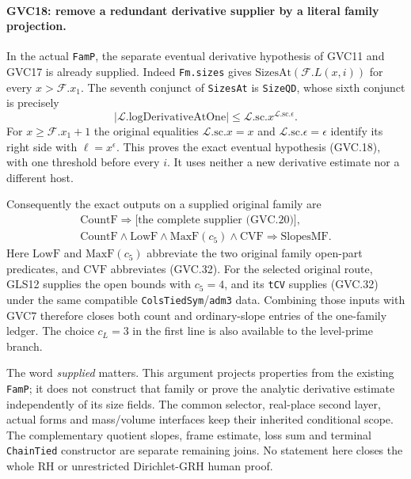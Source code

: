 \paragraph{GVC18: remove a redundant derivative supplier by a literal family projection.}
\label{claim:GVC18}
In the actual \texttt{FamP}, the separate eventual derivative
hypothesis of GVC11 and GVC17 is already supplied.
Indeed \texttt{Fm.sizes} gives
$\mathrm{SizesAt}(\mathcal F.L(x,i))$ for every
$x>\mathcal F.x_1$. The seventh conjunct of \texttt{SizesAt}
is \texttt{SizeQD}, whose sixth conjunct is precisely
\[
 |\mathcal L.\mathrm{logDerivativeAtOne}|
          \le\mathcal L.\mathrm{sc}.x^{
                         \mathcal L.\mathrm{sc}.\epsilon}.
\]
For $x\ge\mathcal F.x_1+1$ the original equalities
$\mathcal L.\mathrm{sc}.x=x$ and
$\mathcal L.\mathrm{sc}.\epsilon=\epsilon$ identify its right
side with $\ell=x^\epsilon$.
This proves the exact eventual hypothesis (GVC.18), with one
threshold before every $i$. It uses neither a new derivative
estimate nor a different host.

Consequently the exact outputs on a supplied original family are
\[
 \begin{gathered}
 \mathrm{CountF}\Longrightarrow
 \bigl[\text{the complete supplier (GVC.20)}\bigr],\\
 \mathrm{CountF}\wedge\mathrm{LowF}\wedge
 \mathrm{MaxF}(c_5)\wedge\mathrm{CVF}
       \Longrightarrow\mathrm{SlopesMF}.
 \end{gathered}                                               \tag{GVC.34}
\]
Here $\mathrm{LowF}$ and $\mathrm{MaxF}(c_5)$ abbreviate the
two original family open-part predicates, and $\mathrm{CVF}$
abbreviates (GVC.32).
For the selected original route, GLS12 supplies the open bounds
with $c_5=4$, and its \texttt{tCV} supplies (GVC.32) under the
same compatible \texttt{ColsTiedSym}/\texttt{adm3} data.
Combining those inputs with GVC7 therefore closes both count and
ordinary-slope entries of the one-family ledger.
The choice $c_L=3$ in the first line is also available to the
level-prime branch.

The word \emph{supplied} matters. This argument projects properties
from the existing \texttt{FamP}; it does not construct that family
or prove the analytic derivative estimate independently of its
size fields. The common selector, real-place second layer,
actual forms and mass/volume interfaces keep their inherited
conditional scope. The complementary quotient slopes, frame
estimate, loss sum and terminal \texttt{ChainTied} constructor
are separate remaining joins. No statement here closes the
whole RH or unrestricted Dirichlet-GRH human proof.
